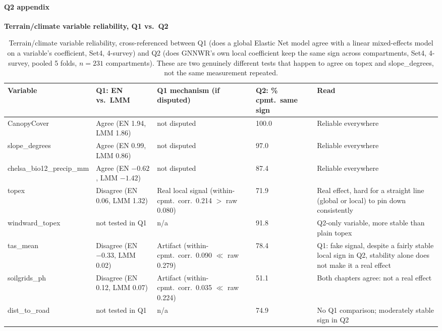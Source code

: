 \documentclass[logo,msc,ai]{infthesis}           %
\begin{document}
\paragraph*{Q2 appendix}
\label{app:results-q2}


\begin{table}[H]
\centering
\textbf{Terrain/climate variable reliability, Q1 vs.\ Q2}\label{app:results-q2-reliability}\\[4pt]
\scriptsize
\setlength{\tabcolsep}{3pt}
\renewcommand{\arraystretch}{1.2}
\begin{tabular}{p{2.4cm}p{2.6cm}p{3.6cm}p{1.3cm}p{2.6cm}}
\toprule
Variable & Q1: EN vs.\ LMM & Q1 mechanism (if disputed) & Q2: \% cpmt.\ same sign & Read \\
\midrule
CanopyCover & Agree (EN 1.94, LMM 1.86) & not disputed & 100.0 & Reliable everywhere \\
slope\_degrees & Agree (EN 0.99, LMM 0.86) & not disputed & 97.0 & Reliable everywhere \\
chelsa\_bio12\_precip\_mm & Agree (EN $-0.62$, LMM $-1.42$) & not disputed & 87.4 & Reliable everywhere \\
topex & Disagree (EN 0.06, LMM 1.32) & Real local signal (within-cpmt.\ corr.\ 0.214 $>$ raw 0.080) & 71.9 & Real effect, hard for a straight line (global or local) to pin down consistently \\
windward\_topex & not tested in Q1 & n/a & 91.8 & Q2-only variable, more stable than plain topex \\
tas\_mean & Disagree (EN $-0.33$, LMM 0.02) & Artifact (within-cpmt.\ corr.\ 0.090 $\ll$ raw 0.279) & 78.4 & Q1: fake signal, despite a fairly stable local sign in Q2, stability alone does not make it a real effect \\
soilgrids\_ph & Disagree (EN 0.12, LMM 0.07) & Artifact (within-cpmt.\ corr.\ 0.035 $\ll$ raw 0.224) & 51.1 & Both chapters agree: not a real effect \\
dist\_to\_road & not tested in Q1 & n/a & 74.9 & No Q1 comparison; moderately stable sign in Q2 \\
\bottomrule
\end{tabular}
\caption{\small{Terrain/climate variable reliability, cross-referenced between Q1 (does a
global Elastic Net model agree with a linear mixed-effects model on a variable's
coefficient, Set4, 4-survey) and Q2 (does GNNWR's own local coefficient keep the same sign
across compartments, Set4, 4-survey, pooled 5 folds, $n=231$ compartments). These are two
genuinely different tests that happen to agree on topex and slope\_degrees, not the same
measurement repeated.}}
\label{tab:results-q2-reliability}
\end{table}
\end{document}
